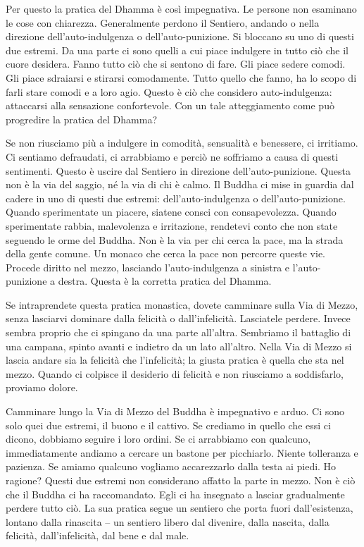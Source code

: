 Per questo la pratica del Dhamma è così impegnativa. Le persone non
esaminano le cose con chiarezza. Generalmente perdono il Sentiero,
andando o nella direzione dell'auto-indulgenza o dell'auto-punizione. Si
bloccano su uno di questi due estremi. Da una parte ci sono quelli a cui
piace indulgere in tutto ciò che il cuore desidera. Fanno tutto ciò che
si sentono di fare. Gli piace sedere comodi. Gli piace sdraiarsi e
stirarsi comodamente. Tutto quello che fanno, ha lo scopo di farli stare
comodi e a loro agio. Questo è ciò che considero auto-indulgenza:
attaccarsi alla sensazione confortevole. Con un tale atteggiamento come
può progredire la pratica del Dhamma?

Se non riusciamo più a indulgere in comodità, sensualità e benessere, ci
irritiamo. Ci sentiamo defraudati, ci arrabbiamo e perciò ne soffriamo a
causa di questi sentimenti. Questo è uscire dal Sentiero in direzione
dell'auto-punizione. Questa non è la via del saggio, né la via di chi è
calmo. Il Buddha ci mise in guardia dal cadere in uno di questi due
estremi: dell'auto-indulgenza o dell'auto-punizione. Quando sperimentate
un piacere, siatene consci con consapevolezza. Quando sperimentate
rabbia, malevolenza e irritazione, rendetevi conto che non state
seguendo le orme del Buddha. Non è la via per chi cerca la pace, ma la
strada della gente comune. Un monaco che cerca la pace non percorre
queste vie. Procede diritto nel mezzo, lasciando l'auto-indulgenza a
sinistra e l'auto-punizione a destra. Questa è la corretta pratica del
Dhamma.

Se intraprendete questa pratica monastica, dovete camminare sulla Via di
Mezzo, senza lasciarvi dominare dalla felicità o dall'infelicità.
Lasciatele perdere. Invece sembra proprio che ci spingano da una parte
all'altra. Sembriamo il battaglio di una campana, spinto avanti e
indietro da un lato all'altro. Nella Via di Mezzo si lascia andare sia
la felicità che l'infelicità; la giusta pratica è quella che sta nel
mezzo. Quando ci colpisce il desiderio di felicità e non riusciamo a
soddisfarlo, proviamo dolore.

Camminare lungo la Via di Mezzo del Buddha è impegnativo e arduo. Ci
sono solo quei due estremi, il buono e il cattivo. Se crediamo in quello
che essi ci dicono, dobbiamo seguire i loro ordini. Se ci arrabbiamo con
qualcuno, immediatamente andiamo a cercare un bastone per picchiarlo.
Niente tolleranza e pazienza. Se amiamo qualcuno vogliamo accarezzarlo
dalla testa ai piedi. Ho ragione? Questi due estremi non considerano
affatto la parte in mezzo. Non è ciò che il Buddha ci ha raccomandato.
Egli ci ha insegnato a lasciar gradualmente perdere tutto ciò. La sua
pratica segue un sentiero che porta fuori dall'esistenza, lontano dalla
rinascita -- un sentiero libero dal divenire, dalla nascita, dalla
felicità, dall'infelicità, dal bene e dal male.

